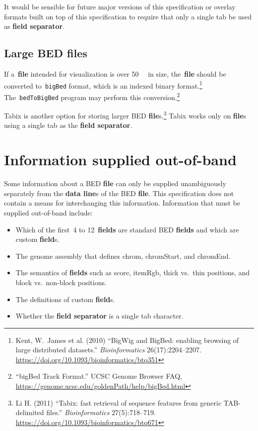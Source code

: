\documentclass[11pt]{article}
\providecommand*{\Ac}[1]{\ac{#1}} %
\begin{document}
It would be sensible for future major versions of this specification or overlay formats built on top of this specification to require that only a single tab be used as \textbf{field separator}.

\subsection{Large \acs{BED} files}
If a~\textbf{file} intended for visualization is over \SI{50}{\mebi\byte} in size, the~\textbf{file} should be converted to~\texttt{bigBed} format, which is an indexed binary format.\footnote{Kent, W.~James et al.
  (2010) ``BigWig and BigBed: enabling browsing of large distributed datasets.''
  \emph{Bioinformatics} 26(17):2204--2207.
  \url{https://doi.org/10.1093/bioinformatics/btq351}}
The~\texttt{bedToBigBed} program may perform this conversion.\footnote{``bigBed Track Format.''
  \Ac{UCSC} Genome Browser FAQ, \url{https://genome.ucsc.edu/goldenPath/help/bigBed.html}}

Tabix is another option for storing larger \ac{BED} \textbf{file}s.\footnote{Li H.
  (2011) ``Tabix: fast retrieval of sequence features from generic TAB-delimited files.''
  \emph{Bioinformatics} 27(5):718--719.
  \url{https://doi.org/10.1093/bioinformatics/btq671}}
Tabix works only on \textbf{file}s using a single tab as the \textbf{field separator}.

\section{Information supplied out-of-band}

Some information about a \ac{BED} \textbf{file} can only be supplied unambiguously separately from the \textbf{data line}s of the \ac{BED} \textbf{file}.
This specification does not contain a means for interchanging this information.
Information that must be supplied out-of-band include:

\begin{itemize}[noitemsep]
    \item Which of the first~4 to 12~\textbf{fields} are standard \ac{BED} \textbf{fields} and which are custom \textbf{field}s.
    \item The genome assembly that defines \textsf{chrom}, \textsf{chromStart}, and \textsf{chromEnd}.
    \item The semantics of \textbf{fields} such as \textsf{score}, \textsf{itemRgb}, thick vs.~thin positions, and block vs.~non-block positions.
    \item The definitions of custom \textbf{field}s.
    \item Whether the \textbf{field separator} is a single tab character.
\end{itemize}
\end{document}

